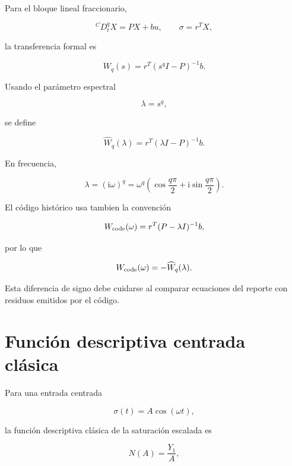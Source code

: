 \documentclass[11pt]{article}
\newcommand{\ii}{\mathrm{i}}
\begin{document}
Para el bloque lineal fraccionario,

\begin{equation}
{}^C D_t^q X=PX+bu,\qquad \sigma=r^TX,
\end{equation}

la transferencia formal es

\begin{equation}
W_q(s)=r^T(s^q I-P)^{-1}b.
\end{equation}

Usando el parámetro espectral

\begin{equation}
\lambda=s^q,
\end{equation}

se define

\begin{equation}
\widehat W_q(\lambda)=r^T(\lambda I-P)^{-1}b.
\end{equation}

En frecuencia,

\begin{equation}
\lambda=(\ii\omega)^q
=
\omega^q
\left(
\cos\frac{q\pi}{2}
+
\ii\sin\frac{q\pi}{2}
\right).
\end{equation}

El código histórico usa tambien la convención

\begin{equation}
W_{\rm code}(\omega)=r^T(P-\lambda I)^{-1}b,
\end{equation}

por lo que

\begin{equation}
W_{\rm code}(\omega)=-\widehat W_q(\lambda).
\end{equation}

Esta diferencia de signo debe cuidarse al comparar ecuaciones del reporte con residuos emitidos por el código.

\section{Función descriptiva centrada clásica}

Para una entrada centrada

\begin{equation}
\sigma(t)=A\cos(\omega t),
\end{equation}

la función descriptiva clásica de la saturación escalada es

\begin{equation}
N(A)=\frac{Y_1}{A},
\end{equation}
\end{document}
